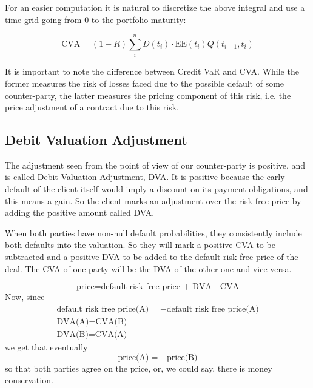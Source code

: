 For an easier computation it is natural to discretize the above integral and use a time grid going from 0 to the portfolio maturity:

\begin{equation}
\text{CVA} = (1-R) \sum_i^n D(t_i) \cdot \mathrm{EE}(t_i) Q(t_{i-1}, t_i)
\label{eq:cva_discrete}
\end{equation}

It is important to note the difference between Credit VaR and CVA. While the former measures the risk of losses faced due to the possible default of some counter-party, the latter measures the pricing component of this risk, i.e. the price adjustment of a contract due to this risk.

\subsection{Debit Valuation Adjustment}

The adjustment seen from the point of view of our counter-party is positive, and is called Debit Valuation Adjustment, DVA. It is positive because the early default of the client itself would imply a discount on its payment obligations, and this means a gain. So the client marks an adjustment over the risk free price by adding the positive amount called DVA. 

When both parties have non-null default probabilities, they consistently include both defaults into the valuation. So they will mark a positive CVA to be subtracted and a positive DVA to be added to the default risk free price of the deal. The CVA of one party will be the DVA of the other one and vice versa.

\begin{equation*}
\textrm{price}=\textrm{default risk free price + DVA - CVA}
\end{equation*}
Now, since
\begin{equation*}
\begin{gathered}
\textrm{default risk free price(A)} = - \textrm{default risk free price(A)} \\
\textrm{DVA(A)} = \textrm{CVA(B)} \\
\textrm{DVA(B)} = \textrm{CVA(A)} 
\end{gathered}
\end{equation*}
we get that eventually
\begin{equation*}
\textrm{price(A)} = -\textrm{price(B)}
\end{equation*}
so that both parties agree on the price, or, we could say, there is money conservation.


